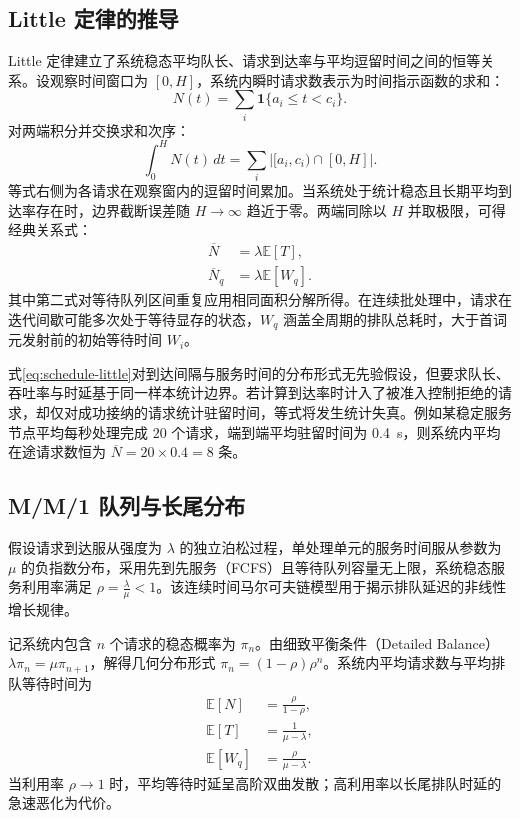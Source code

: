 \documentclass[../textbook.tex]{subfiles}
\begin{document}
\subsection{Little 定律的推导}
Little 定律建立了系统稳态平均队长、请求到达率与平均逗留时间之间的恒等关系\cite{little1961queue}。设观察时间窗口为 $[0,H]$，系统内瞬时请求数表示为时间指示函数的求和：
\begin{equation}
 N(t)=\sum_i\mathbf1\{a_i\le t<c_i\}.
\end{equation}
对两端积分并交换求和次序：
\begin{equation}
 \int_0^H N(t)\,dt
 =\sum_i |[a_i,c_i)\cap[0,H]|.
 \label{eq:schedule-area}
\end{equation}
等式右侧为各请求在观察窗内的逗留时间累加。当系统处于统计稳态且长期平均到达率存在时，边界截断误差随 $H\to\infty$ 趋近于零。两端同除以 $H$ 并取极限，可得经典关系式：
\begin{equation}\label{eq:schedule-little}
 \begin{aligned}
  \overline N&=\lambda\mathbb E[T],\\
  \overline N_q&=\lambda\mathbb E[W_q].
 \end{aligned}
\end{equation}
其中第二式对等待队列区间重复应用相同面积分解所得。在连续批处理中，请求在迭代间歇可能多次处于等待显存的状态，$W_q$ 涵盖全周期的排队总耗时，大于首词元发射前的初始等待时间 $W_i$。

式\eqref{eq:schedule-little}对到达间隔与服务时间的分布形式无先验假设，但要求队长、吞吐率与时延基于同一样本统计边界。若计算到达率时计入了被准入控制拒绝的请求，却仅对成功接纳的请求统计驻留时间，等式将发生统计失真。例如某稳定服务节点平均每秒处理完成 $20$ 个请求，端到端平均驻留时间为 \qty{0.4}{\second}，则系统内平均在途请求数恒为 $\overline{N}=20\times 0.4=8$ 条。

\subsection{M/M/1 队列与长尾分布}
\begin{assumption}
假设请求到达服从强度为 $\lambda$ 的独立泊松过程，单处理单元的服务时间服从参数为 $\mu$ 的负指数分布，采用先到先服务（FCFS）且等待队列容量无上限，系统稳态服务利用率满足 $\rho=\frac{\lambda}{\mu}<1$。该连续时间马尔可夫链模型用于揭示排队延迟的非线性增长规律。
\end{assumption}

记系统内包含 $n$ 个请求的稳态概率为 $\pi_n$。由细致平衡条件（Detailed Balance）$\lambda\pi_n=\mu\pi_{n+1}$，解得几何分布形式 $\pi_n=(1-\rho)\rho^n$。系统内平均请求数与平均排队等待时间为
\begin{equation}\label{eq:schedule-mm1-mean}
 \begin{aligned}
  \mathbb E[N]&=\frac{\rho}{1-\rho},\\
  \mathbb E[T]&=\frac{1}{\mu-\lambda},\\
  \mathbb E[W_q]&=\frac{\rho}{\mu-\lambda}.
 \end{aligned}
\end{equation}
当利用率 $\rho\to 1$ 时，平均等待时延呈高阶双曲发散；高利用率以长尾排队时延的急速恶化为代价。
\end{document}
